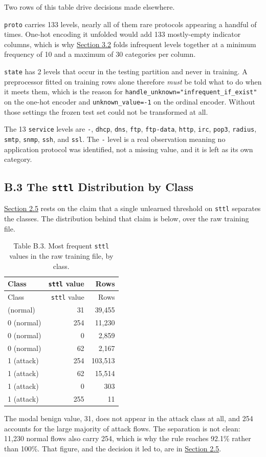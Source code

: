 \documentclass[
  canadian,
  12pt,
]{article}
\let\reportOrigSubsection\subsection
\renewcommand{\subsection}{\par\Needspace*{8\baselineskip}\reportOrigSubsection}%
\begin{document}
Two rows of this table drive decisions made elsewhere.

\texttt{proto} carries 133 levels, nearly all of them rare protocols
appearing a handful of times. One-hot encoding it unfolded would add 133
mostly-empty indicator columns, which is why \hyperref[sec-3-2]{Section
3.2} folds infrequent levels together at a minimum frequency of 10 and a
maximum of 30 categories per column.

\texttt{state} has 2 levels that occur in the testing partition and
never in training. A preprocessor fitted on training rows alone
therefore \emph{must} be told what to do when it meets them, which is
the reason for \texttt{handle\_\allowbreak{}unknown="infrequent\_\allowbreak{}if\_\allowbreak{}exist"} on the
one-hot encoder and \texttt{unknown\_value=-1} on the ordinal encoder.
Without those settings the frozen test set could not be transformed at
all.

The 13 \texttt{service} levels are \texttt{-}, \texttt{dhcp},
\texttt{dns}, \texttt{ftp}, \texttt{ftp-data}, \texttt{http},
\texttt{irc}, \texttt{pop3}, \texttt{radius}, \texttt{smtp},
\texttt{snmp}, \texttt{ssh}, and \texttt{ssl}. The \texttt{-} level is a
real observation meaning no application protocol was identified, not a
missing value, and it is left as its own category.

\subsection{\texorpdfstring{B.3 The \texttt{sttl} Distribution by
Class}{B.3 The sttl Distribution by Class}}\label{sec-app-isaac-3}

\hyperref[sec-2-5]{Section 2.5} rests on the claim that a single
unlearned threshold on \texttt{sttl} separates the classes. The
distribution behind that claim is below, over the raw training file.

\begin{longtable}[]{@{}lrr@{}}
\caption{Table B.3. Most frequent \texttt{sttl} values in the raw
training file, by class.}\tabularnewline
\toprule\noalign{}
Class & \texttt{sttl} value & Rows \\
\midrule\noalign{}
\endfirsthead
\toprule\noalign{}
Class & \texttt{sttl} value & Rows \\
\midrule\noalign{}
\endhead
\bottomrule\noalign{}
\endlastfoot
0 (normal) & 31 & 39,455 \\
0 (normal) & 254 & 11,230 \\
0 (normal) & 0 & 2,859 \\
0 (normal) & 62 & 2,167 \\
1 (attack) & 254 & 103,513 \\
1 (attack) & 62 & 15,514 \\
1 (attack) & 0 & 303 \\
1 (attack) & 255 & 11 \\
\end{longtable}

The modal benign value, 31, does not appear in the attack class at all,
and 254 accounts for the large majority of attack flows. The separation
is not clean: 11,230 normal flows also carry 254, which is why the rule
reaches 92.1\% rather than 100\%. That figure, and the decision it led
to, are in \hyperref[sec-2-5]{Section 2.5}.
\end{document}
